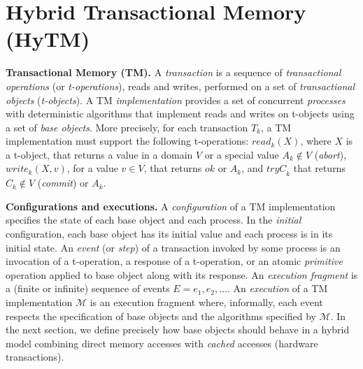 \section{Hybrid Transactional Memory (HyTM)}
\label{sec:hytm}
%
\vspace{1mm}\noindent\textbf{Transactional Memory (TM).} 
A \emph{transaction} is a sequence of \emph{transactional operations}
(or \emph{t-operations}), reads and writes, performed on a set of \emph{transactional objects} 
(\emph{t-objects}). 
A TM \emph{implementation} provides a set of
concurrent \emph{processes} with deterministic algorithms that implement reads and
writes on t-objects using  a set of \emph{base objects}.
More precisely, for each transaction $T_k$, a TM implementation must support the following t-operations: 
$\mathit{read}_k(X)$, where $X$ is a t-object, that returns a value in
a domain $V$
or a special value $A_k\notin V$ (\emph{abort}),
$\mathit{write}_k(X,v)$, for a value $v \in V$,
that returns $\mathit{ok}$ or $A_k$, and
$\mathit{tryC}_k$ that returns $C_k\notin V$ (\emph{commit}) or $A_k$.

\vspace{1mm}\noindent\textbf{Configurations and executions.} 
A \emph{configuration} of a TM implementation specifies the state of each base object and each process. 
In the \emph{initial} configuration, each base object has its initial value and each process is in its initial state. 
An \emph{event} (or \emph{step}) of a transaction invoked by some process is an invocation of a t-operation, 
a response of a t-operation, or an atomic \emph{primitive} operation applied to base object along with its response. 
An \emph{execution fragment} is a (finite or infinite) sequence of events $E = e_1,e_2,\dots$. 
An \emph{execution} of a TM implementation $\mathcal{M}$ is an
execution fragment where, informally, each event respects the
specification of base objects and the algorithms specified by $\mathcal{M}$.
In the next section, we define precisely how base objects should
behave in a hybrid model combining direct memory accesses with \emph{cached} accesses (hardware
transactions).

